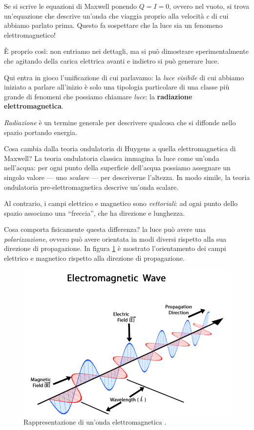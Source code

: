 \documentclass[a4paper,12pt]{article}
\begin{document}
Se si scrive le equazioni di Maxwell ponendo \(Q = I = 0\), ovvero nel vuoto, si trova un'equazione che descrive un'onda che viaggia proprio alla velocità \(c\) di cui abbiamo parlato prima. 
Questo fa sospettare che la luce sia un fenomeno elettromagnetico! 

È proprio così: non entriamo nei dettagli, ma si può dimostrare sperimentalmente che agitando della carica elettrica avanti e indietro si può generare luce.

Qui entra in gioco l'unificazione di cui parlavamo: la \emph{luce visibile} di cui abbiamo iniziato a parlare all'inizio è solo una tipologia particolare di una classe più grande di fenomeni che possiamo chiamare \emph{luce}: la \textbf{radiazione elettromagnetica}.

\emph{Radiazione} è un termine generale per descrivere qualcosa che si diffonde nello spazio portando energia.

Cosa cambia dalla teoria ondulatoria di Huygens a quella elettromagnetica di Maxwell?
La teoria ondulatoria classica immagina la luce come un'onda nell'acqua: per ogni punto della superficie dell'acqua possiamo assegnare un singolo valore --- uno \emph{scalare} --- per descriverne l'altezza.
In modo simile, la teoria ondulatoria pre-elettromagnetica descrive un'onda scalare.

Al contrario, i campi elettrico e magnetico sono \emph{vettoriali}: ad ogni punto dello spazio associano una ``freccia'', che ha direzione e lunghezza.

Cosa comporta fisicamente questa differenza? la luce può avere una \emph{polarizzazione}, ovvero può avere orientata in modi diversi rispetto alla sua direzione di propagazione. 
In figura \ref{fig:Electromagnetic-waves} è mostrato l'orientamento dei campi elettrico e magnetico rispetto alla direzione di propagazione.

\begin{figure}[ht]
\centering
\includegraphics[width=\textwidth]{800px-Electromagnetic_waves.png}
\caption{Rappresentazione di un'onda elettromagnetica \cite[]{dechammaklKnnddRr2018}.}
\label{fig:Electromagnetic-waves}
\end{figure}
\end{document}
